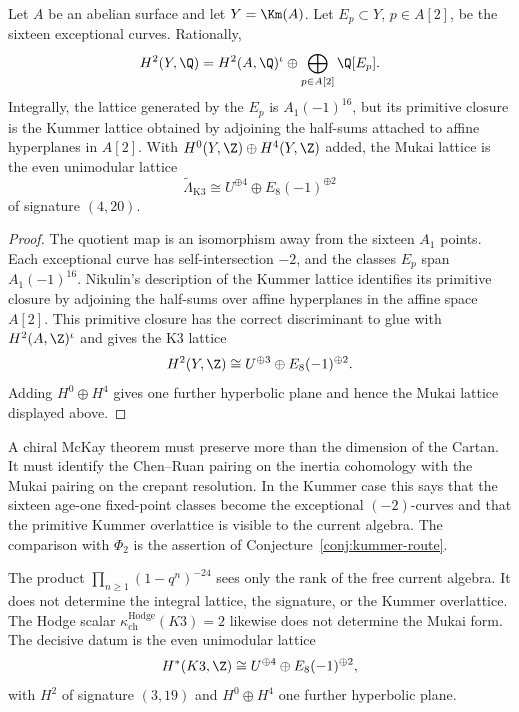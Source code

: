 \begin{proposition}
\label{prop:kummer-step5-excision}
Let \(A\) be an abelian surface and let \(Y=\Km(A)\).  Let
\(E_p\subset Y\), \(p\in A[2]\), be the sixteen exceptional curves.
Rationally,
\[
 H^2(Y,\Q)
 =
 H^2(A,\Q)^{\iota}
 \oplus
 \bigoplus_{p\in A[2]}\Q[E_p].
\]
Integrally, the lattice generated by the \(E_p\) is \(A_1(-1)^{16}\),
but its primitive closure is the Kummer lattice obtained by adjoining
the half-sums attached to affine hyperplanes in \(A[2]\).  With
\(H^0(Y,\Z)\oplus H^4(Y,\Z)\) added, the Mukai lattice is the even
unimodular lattice
\[
 \widetilde\Lambda_{\mathrm{K3}}
 \cong
 U^{\oplus4}\oplus E_8(-1)^{\oplus2}
\]
of signature \((4,20)\).
\end{proposition}

\begin{proof}
The quotient map is an isomorphism away from the sixteen \(A_1\)
points.  Each exceptional curve has self-intersection \(-2\), and the
classes \(E_p\) span \(A_1(-1)^{16}\).  Nikulin's description of the
Kummer lattice identifies its primitive closure by adjoining the
half-sums over affine hyperplanes in the affine space \(A[2]\).  This
primitive closure has the correct discriminant to glue with
\(H^2(A,\Z)^\iota\) and gives the K3 lattice
\[
 H^2(Y,\Z)\cong U^{\oplus3}\oplus E_8(-1)^{\oplus2}.
\]
Adding \(H^0\oplus H^4\) gives one further hyperbolic plane and hence
the Mukai lattice displayed above.
\end{proof}

\begin{remark}
\label{rem:kummer-step5-reduction}
A chiral McKay theorem must preserve more than the dimension of the
Cartan.  It must identify the Chen--Ruan pairing on the inertia
cohomology with the Mukai pairing on the crepant resolution.  In the
Kummer case this says that the sixteen age-one fixed-point classes
become the exceptional \((-2)\)-curves and that the primitive Kummer
overlattice is visible to the current algebra.  The comparison with
\(\Phi_2\) is the assertion of Conjecture~\textup{\ref{conj:kummer-route}}.
\end{remark}

\begin{remark}
\label{rem:kummer-step5-gap}
The product \(\prod_{n\geq1}(1-q^n)^{-24}\) sees only the rank of the
free current algebra.  It does not determine the integral lattice, the
signature, or the Kummer overlattice.  The Hodge scalar
\(\kappa_{\mathrm{ch}}^{\mathrm{Hodge}}(K3)=2\) likewise does not
determine the Mukai form.  The decisive datum is the even unimodular
lattice
\[
 H^*(K3,\Z)\cong U^{\oplus4}\oplus E_8(-1)^{\oplus2},
\]
with \(H^2\) of signature \((3,19)\) and \(H^0\oplus H^4\) one further
hyperbolic plane.
\end{remark}


